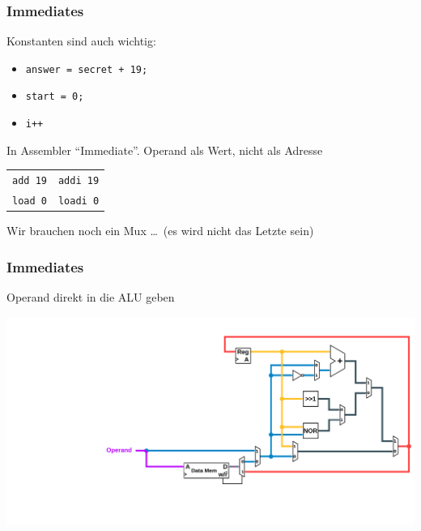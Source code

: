\documentclass[t,aspectratio=169,usenames,dvipsnames]{beamer}
\begin{document}
\begin{frame}
  \frametitle{Immediates}

  Konstanten sind auch wichtig:
  \begin{itemize}
  \item \texttt{answer = secret + 19;}
  \item \texttt{start = 0;}
  \item \texttt{i++}
  \end{itemize}

  \bigskip

  In Assembler \enquote{Immediate}. Operand als Wert, nicht als Adresse

  \medskip

  {\Large
    \begin{tabular}{ll}
      \texttt{add 19} & \texttt{addi 19} \\
      \texttt{load 0} & \texttt{loadi 0} \\
    \end{tabular}
  }

  \bigskip

  \pause
  Wir brauchen noch ein Mux \ldots\ (es wird nicht das Letzte sein)
\end{frame}

\begin{frame}
  \frametitle{Immediates}

  \strut{}Operand direkt in die ALU geben

  \begin{center}
    \includegraphics[width=.85\textwidth]{sch-immediate.pdf}
  \end{center}
\end{frame}
\end{document}
